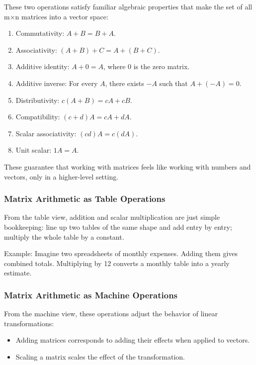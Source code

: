 \documentclass[
  letterpaper,
  DIV=11,
  numbers=noendperiod]{scrreprt}
\providecommand{\tightlist}{%
  \setlength{\itemsep}{0pt}\setlength{\parskip}{0pt}}
\begin{document}
These two operations satisfy familiar algebraic properties that make the
set of all m×n matrices into a vector space:

\begin{enumerate}
\def\labelenumi{\arabic{enumi}.}
\tightlist
\item
  Commutativity: \(A + B = B + A\).
\item
  Associativity: \((A + B) + C = A + (B + C)\).
\item
  Additive identity: \(A + 0 = A\), where 0 is the zero matrix.
\item
  Additive inverse: For every \(A\), there exists \(-A\) such that
  \(A + (-A) = 0\).
\item
  Distributivity: \(c(A + B) = cA + cB\).
\item
  Compatibility: \((c + d)A = cA + dA\).
\item
  Scalar associativity: \((cd)A = c(dA)\).
\item
  Unit scalar: \(1A = A\).
\end{enumerate}

These guarantee that working with matrices feels like working with
numbers and vectors, only in a higher-level setting.

\subsubsection{Matrix Arithmetic as Table
Operations}\label{matrix-arithmetic-as-table-operations}

From the table view, addition and scalar multiplication are just simple
bookkeeping: line up two tables of the same shape and add entry by
entry; multiply the whole table by a constant.

Example: Imagine two spreadsheets of monthly expenses. Adding them gives
combined totals. Multiplying by 12 converts a monthly table into a
yearly estimate.

\subsubsection{Matrix Arithmetic as Machine
Operations}\label{matrix-arithmetic-as-machine-operations}

From the machine view, these operations adjust the behavior of linear
transformations:

\begin{itemize}
\tightlist
\item
  Adding matrices corresponds to adding their effects when applied to
  vectors.
\item
  Scaling a matrix scales the effect of the transformation.
\end{itemize}
\end{document}

